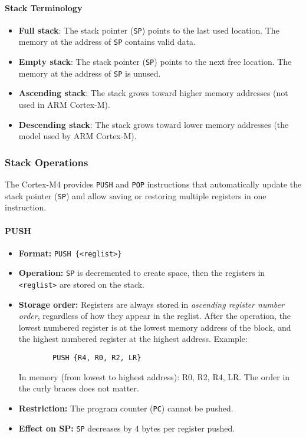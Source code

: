 \paragraph{Stack Terminology}
\begin{itemize}[nosep]
    \item \textbf{Full stack}: The stack pointer (\texttt{SP}) points to the last used location.  
          The memory at the address of \texttt{SP} contains valid data.
    \item \textbf{Empty stack}: The stack pointer (\texttt{SP}) points to the next free location.  
          The memory at the address of \texttt{SP} is unused.
    \item \textbf{Ascending stack}: The stack grows toward higher memory addresses (not used in ARM Cortex-M).
    \item \textbf{Descending stack}: The stack grows toward lower memory addresses (the model used by ARM Cortex-M).
\end{itemize}
\subsubsection{Stack Operations}

The Cortex-M4 provides \texttt{PUSH} and \texttt{POP} instructions that automatically update the stack pointer (\texttt{SP}) and allow saving or restoring multiple registers in one instruction.

\paragraph{PUSH}
\begin{itemize}[nosep]
    \item \textbf{Format:} \texttt{PUSH \{<reglist>\}}
    \item \textbf{Operation:} \texttt{SP} is decremented to create space, then the registers in \texttt{<reglist>} are stored on the stack.
    \item \textbf{Storage order:} Registers are always stored in \emph{ascending register number order}, regardless of how they appear in the reglist.  
          After the operation, the lowest numbered register is at the lowest memory address of the block, and the highest numbered register at the highest address.  
          Example:
\begin{lstlisting}
        PUSH {R4, R0, R2, LR}
\end{lstlisting}
          In memory (from lowest to highest address): R0, R2, R4, LR.  
          The order in the curly braces does not matter.
    \item \textbf{Restriction:} The program counter (\texttt{PC}) cannot be pushed.
    \item \textbf{Effect on SP:} \texttt{SP} decreases by 4 bytes per register pushed.
\end{itemize}



